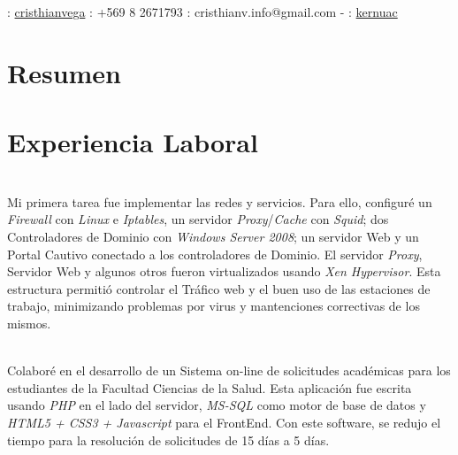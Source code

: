 \documentclass[]{cvStyle1}
\begin{document}
    \begin{header}
        \\
        \\
        \contact
            {\faLinkedin : \href{http://www.linkedin.com/in/cristhianvega}{cristhianvega}}
            {\Mobilefone : +569 8 2671793}
            {\Letter : cristhianv.info@gmail.com - \faGithub : \href{http://github.com/kernuac}{kernuac}}
    \end{header} 
     
    \section*{Resumen}
        
    \section*{Experiencia Laboral}
        {
            \begin{description}[leftmargin=0cm]
                \item [Administrador de Sistemas] \hfill \\
                Mi primera tarea fue implementar las redes y servicios. 
                Para ello, configur\'e un {\em Firewall} con {\em Linux} e {\em Iptables}, 
                un servidor {\em Proxy}/{\em Cache} con {\em Squid}; dos Controladores 
                de Dominio con {\em Windows Server 2008}; un servidor Web y 
                un Portal Cautivo conectado a los controladores de 
                Dominio. El servidor {\em Proxy}, Servidor Web y algunos otros
                fueron virtualizados usando {\em Xen Hypervisor}. Esta 
                estructura permiti\'o controlar el Tr\'afico web y el buen 
                uso de las estaciones de trabajo, minimizando problemas 
                por virus y mantenciones correctivas de los mismos.

                \item [Desarrollador de Aplicaciones] \hfill \\
                Colabor\'e en el desarrollo de un Sistema on-line de 
                solicitudes acad\'emicas para los estudiantes de la 
                Facultad Ciencias de la Salud. Esta aplicaci\'on fue 
                escrita usando {\em PHP} en el lado del servidor, {\em MS-SQL} 
                como motor de base de datos y {\em HTML5 + CSS3 + Javascript} 
                para el FrontEnd. Con este software, se redujo el tiempo
                para la resoluci\'on de solicitudes de 15 d\'ias a 5 d\'ias.
            
            \end{description}
        }
                     
\end{document}
